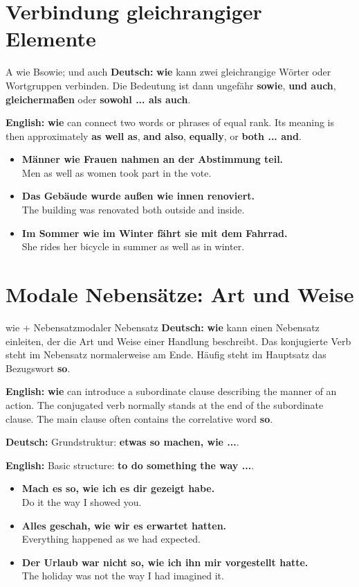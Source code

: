 \documentclass[a4paper,11pt]{article}
\newcommand{\GermanText}[1]{\textbf{Deutsch: }#1\par}
\newcommand{\EnglishText}[1]{{\small\color{SoftGray}\textbf{English: }#1\par}}
\newcommand{\ExampleItem}[2]{\item \textbf{#1}\\{\small\color{SoftGray}#2}}
\begin{document}
\section{Verbindung gleichrangiger Elemente}

\begin{grammarentry}{A wie B}{sowie; und auch}
\GermanText{\textbf{wie} kann zwei gleichrangige Wörter oder Wortgruppen verbinden. Die Bedeutung ist dann ungefähr \textbf{sowie}, \textbf{und auch}, \textbf{gleichermaßen} oder \textbf{sowohl ... als auch}.}
\EnglishText{\textbf{wie} can connect two words or phrases of equal rank. Its meaning is then approximately \textbf{as well as}, \textbf{and also}, \textbf{equally}, or \textbf{both ... and}.}
\end{grammarentry}

\begin{exbox}
\begin{itemize}
\ExampleItem{Männer wie Frauen nahmen an der Abstimmung teil.}{Men as well as women took part in the vote.}
\ExampleItem{Das Gebäude wurde außen wie innen renoviert.}{The building was renovated both outside and inside.}
\ExampleItem{Im Sommer wie im Winter fährt sie mit dem Fahrrad.}{She rides her bicycle in summer as well as in winter.}
\end{itemize}
\end{exbox}

\section{Modale Nebensätze: Art und Weise}

\begin{grammarentry}{wie + Nebensatz}{modaler Nebensatz}
\GermanText{\textbf{wie} kann einen Nebensatz einleiten, der die Art und Weise einer Handlung beschreibt. Das konjugierte Verb steht im Nebensatz normalerweise am Ende. Häufig steht im Hauptsatz das Bezugswort \textbf{so}.}
\EnglishText{\textbf{wie} can introduce a subordinate clause describing the manner of an action. The conjugated verb normally stands at the end of the subordinate clause. The main clause often contains the correlative word \textbf{so}.}

\GermanText{Grundstruktur: \textbf{etwas so machen, wie ...}.}
\EnglishText{Basic structure: \textbf{to do something the way ...}.}
\end{grammarentry}

\begin{exbox}
\begin{itemize}
\ExampleItem{Mach es so, wie ich es dir gezeigt habe.}{Do it the way I showed you.}
\ExampleItem{Alles geschah, wie wir es erwartet hatten.}{Everything happened as we had expected.}
\ExampleItem{Der Urlaub war nicht so, wie ich ihn mir vorgestellt hatte.}{The holiday was not the way I had imagined it.}
\end{itemize}
\end{exbox}
\end{document}

